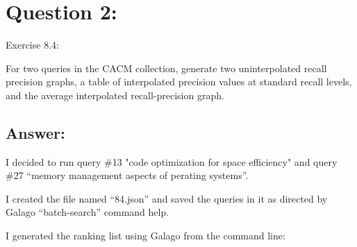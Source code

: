 \section*{Question 2:}
Exercise 8.4: 

For two queries in the CACM collection, generate two uninterpolated recall precision graphs, a table of interpolated precision values at standard recall levels, and the average interpolated recall-precision graph.

\subsection*{Answer:}

I decided to run query \#13 "code optimization for space efficiency" and query \#27 ``memory management aspects of perating systems''.

I created the file named ``84.json'' and saved the queries in it as directed by Galago ``batch-search'' command help.



I generated the ranking list using Galago from the command line:

